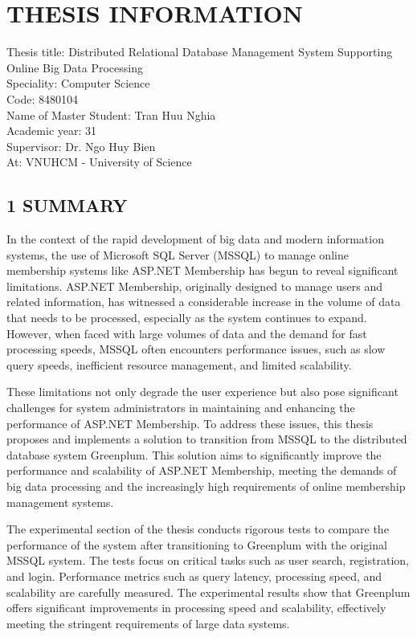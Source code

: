 \documentclass{article}[13pt]
\begin{document}
\pagebreak
{}
{}
\section*{\centering \MakeUppercase{THESIS INFORMATION}}

Thesis title: Distributed Relational Database Management System
Supporting Online Big Data Processing\\
Speciality: Computer Science \\
Code: 8480104\\
Name of Master Student: Tran Huu Nghia\\
Academic year: 31\\
Supervisor: Dr. Ngo Huy Bien\\
At: VNUHCM - University of Science



\subsection*{1 SUMMARY}
In the context of the rapid development of big data and modern information systems, the use of Microsoft SQL Server (MSSQL) to manage online membership systems like ASP.NET Membership has begun to reveal significant limitations. ASP.NET Membership, originally designed to manage users and related information, has witnessed a considerable increase in the volume of data that needs to be processed, especially as the system continues to expand. However, when faced with large volumes of data and the demand for fast processing speeds, MSSQL often encounters performance issues, such as slow query speeds, inefficient resource management, and limited scalability.

These limitations not only degrade the user experience but also pose significant challenges for system administrators in maintaining and enhancing the performance of ASP.NET Membership. To address these issues, this thesis proposes and implements a solution to transition from MSSQL to the distributed database system Greenplum. This solution aims to significantly improve the performance and scalability of ASP.NET Membership, meeting the demands of big data processing and the increasingly high requirements of online membership management systems.

The experimental section of the thesis conducts rigorous tests to compare the performance of the system after transitioning to Greenplum with the original MSSQL system. The tests focus on critical tasks such as user search, registration, and login. Performance metrics such as query latency, processing speed, and scalability are carefully measured. The experimental results show that Greenplum offers significant improvements in processing speed and scalability, effectively meeting the stringent requirements of large data systems.
\end{document}
